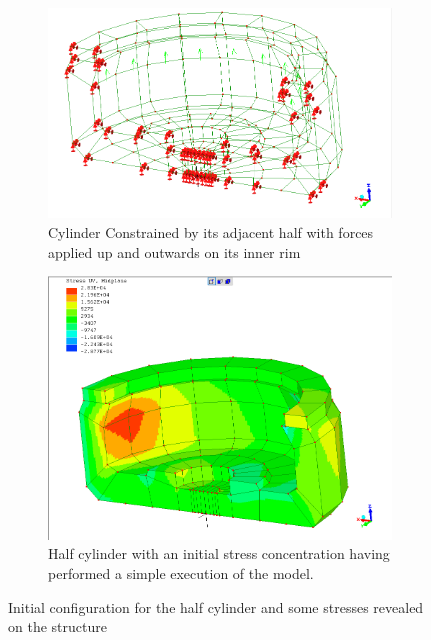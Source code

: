  
 \begin{figure}[H]
\centering
\begin{subfigure}{.5\textwidth}
  \centering
  \includegraphics[width=0.9\linewidth]{../Graphics/HalfCylinder/ForcesAndConstraintsOnCylinderPNG.png}
  \caption{Cylinder Constrained by its adjacent half with forces applied up and outwards on its inner rim}
  \label{fig:sub1}
\end{subfigure}%
\begin{subfigure}{.5\textwidth}
  \centering
  \includegraphics[width=0.9\linewidth]{../Graphics/HalfCylinder/InitialStress.png}
  \caption{Half cylinder with an initial stress concentration having performed a simple execution of the model.}
  \label{fig:sub2}
\end{subfigure}
\label{fig:test}
  \caption{Initial configuration for the half cylinder and some stresses revealed on the structure}
 \end{figure}
 
